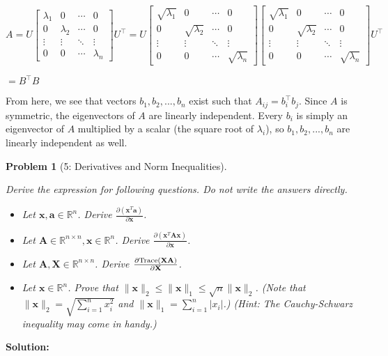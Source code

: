 \documentclass[11pt]{exam}
\theoremstyle{quest}
\newtheorem*{question}{Problem}
\newcommand{\R}{\mathbb{R}}
\begin{document}
\begin{itemize}
$ A = U\begin{bmatrix}
  \lambda_{1} & 0 & \cdots & 0 \\
  0 & \lambda_{2} & \cdots & 0 \\
  \vdots & \vdots & \ddots & \vdots \\
  0 & 0 & \cdots & \lambda_{n}
\end{bmatrix}U^{\top}
=
U\begin{bmatrix}
  \sqrt{\lambda_{1}} & 0 & \cdots & 0 \\
  0 & \sqrt{\lambda_{2}} & \cdots & 0 \\
  \vdots & \vdots & \ddots & \vdots \\
  0 & 0 & \cdots & \sqrt{\lambda_{n}}
\end{bmatrix}
\begin{bmatrix}
  \sqrt{\lambda_{1}} & 0 & \cdots & 0 \\
  0 & \sqrt{\lambda_{2}} & \cdots & 0 \\
  \vdots & \vdots & \ddots & \vdots \\
  0 & 0 & \cdots & \sqrt{\lambda_{n}}
\end{bmatrix}U^{\top}$

$= B^{\top}B$

From here, we see that vectors $b_1, b_2, ..., b_n$ exist such that $A_{ij} = b_i^{\top}b_j$. Since $A$ is symmetric, the eigenvectors of $A$ are linearly independent. Every $b_i$ is simply an eigenvector of $A$ multiplied by a scalar (the square root of $\lambda_i$), so $b_1, b_2, ..., b_n$ are linearly independent as well.


\end{itemize}

\newpage


\begin{question}[5: Derivatives and Norm Inequalities]
~

Derive the expression for following questions. Do not write the answers directly.
\begin{itemize}
\item[(a)] Let $\textbf{x}, \textbf{a} \in \R^n$. Derive
  $\frac{\partial \left(\textbf{x}^T\textbf{a}\right)}{\partial \textbf{x}}$.
\item[(b)] Let $\textbf{A} \in \R^{n \times n}, \textbf{x} \in \R^n$.
  Derive
  $\frac{\partial \left(\textbf{x}^T\textbf{A}\textbf{x} \right)}{\partial
    \textbf{x}}$.
\item[(c)] Let $\textbf{A}, \textbf{X} \in \R^{n\times n}$. Derive
  $\frac{\partial \text{Trace(\textbf{XA})}}{\partial \textbf{X}}$.
\item[(d)] Let $\textbf{x}\in \R^n$. Prove that
  $\|\textbf{x}\|_2 \leq \|\textbf{x}\|_1 \leq \sqrt{n}\|\textbf{x}\|_2$. (Note
  that $\|\textbf{x}\|_2=\sqrt{\sum_{i=1}^{n} x_i^2}$ and
  $\|\textbf{x}\|_1=\sum_{i=1}^{n} |x_i|$.) (Hint: The Cauchy-Schwarz inequality may come in handy.)
\end{itemize}
\end{question}
\textbf{Solution:}
\end{document}
